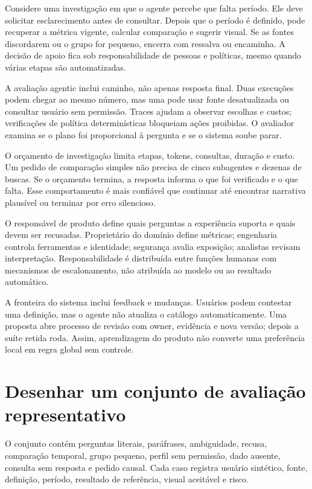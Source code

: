 Considere uma investigação em que o agente percebe que falta período. Ele deve solicitar esclarecimento antes de consultar. Depois que o período é definido, pode recuperar a métrica vigente, calcular comparação e sugerir visual. Se as fontes discordarem ou o grupo for pequeno, encerra com ressalva ou encaminha. A decisão de apoio fica sob responsabilidade de pessoas e políticas, mesmo quando várias etapas são automatizadas.

A avaliação agentic inclui caminho, não apenas resposta final. Duas execuções podem chegar ao mesmo número, mas uma pode usar fonte desatualizada ou consultar usuário sem permissão. Traces ajudam a observar escolhas e custos; verificações de política determinísticas bloqueiam ações proibidas. O avaliador examina se o plano foi proporcional à pergunta e se o sistema soube parar.

O orçamento de investigação limita etapas, tokens, consultas, duração e custo. Um pedido de comparação simples não precisa de cinco subagentes e dezenas de buscas. Se o orçamento termina, a resposta informa o que foi verificado e o que falta. Esse comportamento é mais confiável que continuar até encontrar narrativa plausível ou terminar por erro silencioso.

O responsável de produto define quais perguntas a experiência suporta e quais devem ser recusadas. Proprietário do domínio define métricas; engenharia controla ferramentas e identidade; segurança avalia exposição; analistas revisam interpretação. Responsabilidade é distribuída entre funções humanas com mecanismos de escalonamento, não atribuída ao modelo ou ao resultado automático.

A fronteira do sistema inclui feedback e mudanças. Usuários podem contestar uma definição, mas o agente não atualiza o catálogo automaticamente. Uma proposta abre processo de revisão com owner, evidência e nova versão; depois a suíte retida roda. Assim, aprendizagem do produto não converte uma preferência local em regra global sem controle.

\section{Desenhar um conjunto de avaliação representativo}

O conjunto contém perguntas literais, paráfrases, ambiguidade, recusa, comparação temporal, grupo pequeno, perfil sem permissão, dado ausente, consulta sem resposta e pedido causal. Cada caso registra usuário sintético, fonte, definição, período, resultado de referência, visual aceitável e risco.


